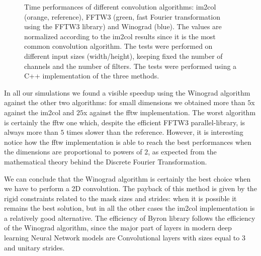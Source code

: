 \documentclass{standalone}
\begin{document}
\begin{figure}[htbp]
\centering
\def\svgwidth{0.8\textwidth}

\caption{Time performances of different convolution algorithms: \textsf{im2col} (orange, reference), \textsf{FFTW3} (green, fast Fourier transformation using the \textsf{FFTW3} library) and \textsf{Winograd} (blue).
The values are normalized according to the \textsf{im2col} results since it is the most common convolution algorithm.
The tests were performed on different input sizes (width/height), keeping fixed the number of channels and the number of filters.
The tests were performed using a \textsf{C++} implementation of the three methods.
}
\label{fig:winograd_timing}
\end{figure}

In all our simulations we found a visible speedup using the \textsf{Winograd} algorithm against the other two algorithms: for small dimensions we obtained more than $5$x against the \textsf{im2col} and $25$x against the \textsf{fftw} implementation.
The worst algorithm is certainly the \textsf{fftw} one which, despite the efficient \textsf{FFTW3} parallel-library, is always more than $5$ times slower than the reference.
However, it is interesting notice how the \textsf{fftw} implementation is able to reach the best performances when the dimensions are proportional to powers of $2$, as expected from the mathematical theory behind the Discrete Fourier Transformation.

We can conclude that the \textsf{Winograd} algorithm is certainly the best choice when we have to perform a 2D convolution.
The payback of this method is given by the rigid constraints related to the mask sizes and strides: when it is possible it remains the best solution, but in all the other cases the \textsf{im2col} implementation is a relatively good alternative.
The efficiency of \textsf{Byron} library follows the efficiency of the \textsf{Winograd} algorithm, since the major part of layers in modern deep learning Neural Network models are Convolutional layers with sizes equal to $3$ and unitary strides.

\end{document}
